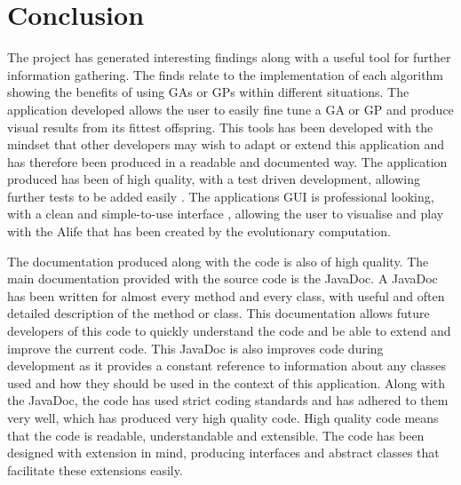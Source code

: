 \documentclass[12pt]{article}
\begin{document}
\section{Conclusion}
The project has generated interesting findings along with a useful tool for further information gathering. The finds relate to the implementation of each algorithm
showing the benefits of using GAs or GPs within different situations. The application developed allows the user to easily fine tune a GA or GP and produce visual results 
from its fittest offspring. This tools has been developed with the mindset that other developers may wish to adapt or extend this application and has therefore
been produced in a readable and documented way. The application produced has been of high quality, with a test driven development, allowing further tests to be
added easily . The applications GUI is professional looking, with a clean and simple-to-use interface , allowing the user to visualise and play with the 
Alife that has been created by the evolutionary computation.

The documentation produced along with the code is also of high quality. The main documentation provided with the source code is the JavaDoc. A JavaDoc has been 
written for almost every method and every class, with useful and often detailed description of the method or class. This documentation allows future developers
of this code to quickly understand the code and be able to extend and improve the current code. This JavaDoc is also improves code during development as it 
provides a constant reference to information about any classes used and how they should be used in the context of this application. 
Along with the JavaDoc, the code has used strict coding standards and has adhered to them very well, which has produced very high quality code. High quality code
means that the code is readable, understandable and extensible. The code has been designed with extension in mind, producing interfaces and abstract classes
that facilitate these extensions easily.
\end{document}
